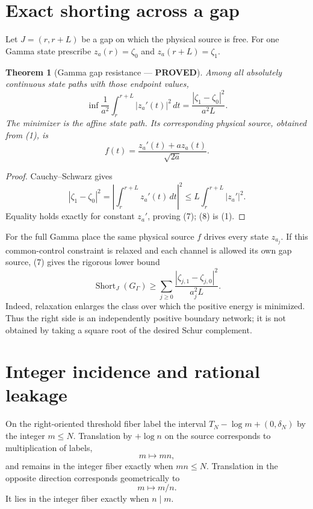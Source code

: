 \documentclass[11pt]{article}
\newcommand{\PROVED}{\textcolor{green!40!black}{\textbf{PROVED}}}
\newtheorem{theorem}{Theorem}
\begin{document}
\section{Exact shorting across a gap}

Let $J=(r,r+L)$ be a gap on which the physical source is free.  For one
Gamma state prescribe $z_a(r)=\zeta_0$ and $z_a(r+L)=\zeta_1$.

\begin{theorem}[Gamma gap resistance --- \PROVED]
Among all absolutely continuous state paths with those endpoint values,
\begin{equation}
 \inf\frac1{a^2}\int_r^{r+L}|z_a'(t)|^2\,dt
 =\frac{|\zeta_1-\zeta_0|^2}{a^2L}.                         \tag{7}
\end{equation}
The minimizer is the affine state path.  Its corresponding physical source,
obtained from (1), is
\begin{equation}
 f(t)=\frac{z_a'(t)+az_a(t)}{\sqrt{2a}}.                    \tag{8}
\end{equation}
\end{theorem}

\begin{proof}
Cauchy--Schwarz gives
\[
 |\zeta_1-\zeta_0|^2
 =\left|\int_r^{r+L}z_a'(t)\,dt\right|^2
 \le L\int_r^{r+L}|z_a'|^2.
\]
Equality holds exactly for constant $z_a'$, proving (7); (8) is (1).
\end{proof}

For the full Gamma place the same physical source $f$ drives every state
$z_{a_j}$.  If this common-control constraint is relaxed and each channel
is allowed its own gap source, (7) gives the rigorous lower bound
\begin{equation}
 \operatorname{Short}_{J}(G_\Gamma)
 \ge
 \sum_{j\ge0}\frac{|\zeta_{j,1}-\zeta_{j,0}|^2}{a_j^2L}.     \tag{9}
\end{equation}
Indeed, relaxation enlarges the class over which the positive energy is
minimized.  Thus the right side is an independently positive boundary
network; it is not obtained by taking a square root of the desired Schur
complement.

\section{Integer incidence and rational leakage}

On the right-oriented threshold fiber label the interval
$T_N-\log m+(0,\delta_N)$ by the integer $m\le N$.  Translation by
$+\log n$ on the source corresponds to multiplication of labels,
\begin{equation}
                         m\longmapsto mn,                     \tag{10}
\end{equation}
and remains in the integer fiber exactly when $mn\le N$.  Translation in
the opposite direction corresponds geometrically to
\begin{equation}
                         m\longmapsto m/n.                    \tag{11}
\end{equation}
It lies in the integer fiber exactly when $n\mid m$.
\end{document}
